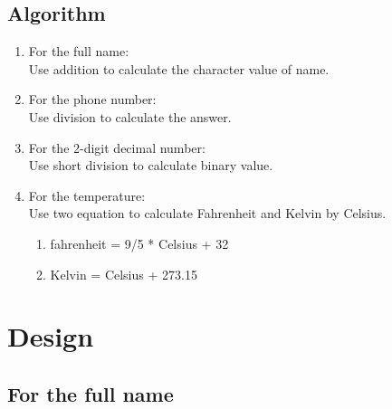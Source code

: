 \documentclass[12pt]{article}
\begin{document}
	\subsection{Algorithm}
	
	\begin{enumerate}
		\item For the full name:\\
		Use addition to calculate the character value of name.
		
		\item For the phone number:\\
		Use division to calculate the answer.
		
		\item For the 2-digit decimal number:\\
		Use short division to calculate binary value.
		
		\item For the temperature:\\
		Use two equation to calculate Fahrenheit and Kelvin by Celsius.
		
		\begin{enumerate}
			\item fahrenheit = 9/5 * Celsius + 32
			
			\item Kelvin = Celsius + 273.15
		\end{enumerate}
	
	\end{enumerate}
	
	
	
	\section{Design}
	
	\subsection{For the full name}
	
\end{document}
